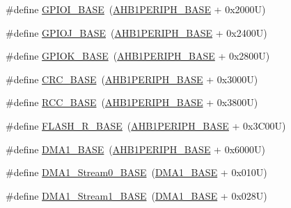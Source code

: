 \begin{DoxyCompactItemize}
\item 
\#define \hyperlink{group___peripheral__memory__map_ga50acf918c2e1c4597d5ccfe25eb3ad3d}{G\+P\+I\+O\+I\+\_\+\+B\+A\+SE}~(\hyperlink{group___peripheral__memory__map_ga811a9a4ca17f0a50354a9169541d56c4}{A\+H\+B1\+P\+E\+R\+I\+P\+H\+\_\+\+B\+A\+SE} + 0x2000\+U)
\item 
\#define \hyperlink{group___peripheral__memory__map_ga73f5a4e42f41acc614ee82c8ebfe0b85}{G\+P\+I\+O\+J\+\_\+\+B\+A\+SE}~(\hyperlink{group___peripheral__memory__map_ga811a9a4ca17f0a50354a9169541d56c4}{A\+H\+B1\+P\+E\+R\+I\+P\+H\+\_\+\+B\+A\+SE} + 0x2400\+U)
\item 
\#define \hyperlink{group___peripheral__memory__map_ga46d3f8cd7c045b5e13cd7395b8e936e5}{G\+P\+I\+O\+K\+\_\+\+B\+A\+SE}~(\hyperlink{group___peripheral__memory__map_ga811a9a4ca17f0a50354a9169541d56c4}{A\+H\+B1\+P\+E\+R\+I\+P\+H\+\_\+\+B\+A\+SE} + 0x2800\+U)
\item 
\#define \hyperlink{group___peripheral__memory__map_ga656a447589e785594cbf2f45c835ad7e}{C\+R\+C\+\_\+\+B\+A\+SE}~(\hyperlink{group___peripheral__memory__map_ga811a9a4ca17f0a50354a9169541d56c4}{A\+H\+B1\+P\+E\+R\+I\+P\+H\+\_\+\+B\+A\+SE} + 0x3000\+U)
\item 
\#define \hyperlink{group___peripheral__memory__map_ga0e681b03f364532055d88f63fec0d99d}{R\+C\+C\+\_\+\+B\+A\+SE}~(\hyperlink{group___peripheral__memory__map_ga811a9a4ca17f0a50354a9169541d56c4}{A\+H\+B1\+P\+E\+R\+I\+P\+H\+\_\+\+B\+A\+SE} + 0x3800\+U)
\item 
\#define \hyperlink{group___peripheral__memory__map_ga8e21f4845015730c5731763169ec0e9b}{F\+L\+A\+S\+H\+\_\+\+R\+\_\+\+B\+A\+SE}~(\hyperlink{group___peripheral__memory__map_ga811a9a4ca17f0a50354a9169541d56c4}{A\+H\+B1\+P\+E\+R\+I\+P\+H\+\_\+\+B\+A\+SE} + 0x3\+C00\+U)
\item 
\#define \hyperlink{group___peripheral__memory__map_gab2d8a917a0e4ea99a22ac6ebf279bc72}{D\+M\+A1\+\_\+\+B\+A\+SE}~(\hyperlink{group___peripheral__memory__map_ga811a9a4ca17f0a50354a9169541d56c4}{A\+H\+B1\+P\+E\+R\+I\+P\+H\+\_\+\+B\+A\+SE} + 0x6000\+U)
\item 
\#define \hyperlink{group___peripheral__memory__map_ga0d3c52aa35dcc68f78b704dfde57ba95}{D\+M\+A1\+\_\+\+Stream0\+\_\+\+B\+A\+SE}~(\hyperlink{group___peripheral__memory__map_gab2d8a917a0e4ea99a22ac6ebf279bc72}{D\+M\+A1\+\_\+\+B\+A\+SE} + 0x010\+U)
\item 
\#define \hyperlink{group___peripheral__memory__map_ga5b4152cef577e37eccc9311d8bdbf3c2}{D\+M\+A1\+\_\+\+Stream1\+\_\+\+B\+A\+SE}~(\hyperlink{group___peripheral__memory__map_gab2d8a917a0e4ea99a22ac6ebf279bc72}{D\+M\+A1\+\_\+\+B\+A\+SE} + 0x028\+U)

\end{DoxyCompactItemize}
